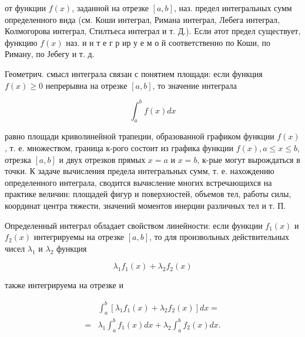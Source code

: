 \documentclass[10pt]{article}
\begin{document}
от функции $f(x)$, заданной на отрезке $[a, b]$, наз. предел интегральных сумм определенного вида (см. Коши интеграл, Римана интеграл, Лебега интеграл, Колмогорова интеграл, Стилтьеса интеграл и т. Д.). Если әтот предел существует, функцию $f(x)$ наз. и н т е г р ир у е м о й соответственно по Коши, по Риману, по Јебегу и т. д.



Геометрич. смысл интеграла связан с понятием площади: если функция $f(x) \geqslant 0$ непрерывна на отрезке $[a, b]$, то значение интеграла



\[

\int_{a}^{b} f(x) d x

\]



равно площади криволинейной трапеции, образованной графиком функции $f(x)$, т. е. множеством, граница к-рого состоит из графика функции $f(x), a \leqslant x \leqslant b$, отрезка $[a, b]$ и двух отрезков прямых $x=a$ и $x=b$, к-рые могут вырождаться в точки. К задаче вычисления предела интегральных сумм, т. е. нахождению определенного интеграла, сводится вычисление многих встречающихся на практике величин: площадей фигур и поверхностей, объемов тел, работы силы, координат центра тяжести, значений моментов инерции различных тел и т. П.



Определенный интеграл обладает свойством линейности: если функции $f_{1}(x)$ и $f_{2}(x)$ интегрируемы на отрезке $[a, b]$, то для произвольных действительных чисел $\lambda_{1}$ и $\lambda_{2}$ функция



\[

\lambda_{1} f_{1}(x)+\lambda_{2} f_{2}(x)

\]



также интегрируема на отрезке и



\[

\begin{aligned}

& \int_{a}^{b}\left[\lambda_{1} f_{1}(x)+\lambda_{2} f_{2}(x)\right] d x= \\

= & \lambda_{1} \int_{a}^{b} f_{1}(x) d x+\lambda_{2} \int_{a}^{b} f_{2}(x) d x .

\end{aligned}

\]
\end{document}
